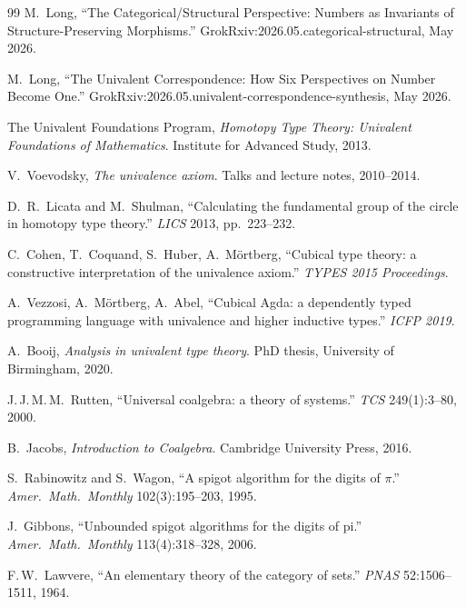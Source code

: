 \documentclass[12pt]{article}
\theoremstyle{definition}
\theoremstyle{remark}
\begin{document}
\begin{thebibliography}{99}
M.\ Long, ``The Categorical/Structural Perspective: Numbers as Invariants
of Structure-Preserving Morphisms.''
GrokRxiv:2026.05.categorical-structural, May 2026.

M.\ Long, ``The Univalent Correspondence: How Six Perspectives on Number
Become One.''
GrokRxiv:2026.05.univalent-correspondence-synthesis, May 2026.


The Univalent Foundations Program, \emph{Homotopy Type Theory: Univalent
Foundations of Mathematics}. Institute for Advanced Study, 2013.

V.\ Voevodsky, \emph{The univalence axiom}. Talks and lecture notes,
2010--2014.

D.\ R.\ Licata and M.\ Shulman, ``Calculating the fundamental group of
the circle in homotopy type theory.'' \emph{LICS} 2013, pp.\ 223--232.


C.\ Cohen, T.\ Coquand, S.\ Huber, A.\ M\"ortberg, ``Cubical type theory:
a constructive interpretation of the univalence axiom.''
\emph{TYPES 2015 Proceedings}.

A.\ Vezzosi, A.\ M\"ortberg, A.\ Abel, ``Cubical Agda: a dependently
typed programming language with univalence and higher inductive types.''
\emph{ICFP 2019}.

A.\ Booij, \emph{Analysis in univalent type theory}. PhD thesis,
University of Birmingham, 2020.


J.\,J.\,M.\,M.\ Rutten, ``Universal coalgebra: a theory of systems.''
\emph{TCS} 249(1):3--80, 2000.

B.\ Jacobs, \emph{Introduction to Coalgebra}. Cambridge University Press,
2016.

S.\ Rabinowitz and S.\ Wagon, ``A spigot algorithm for the digits of
$\pi$.'' \emph{Amer.\ Math.\ Monthly} 102(3):195--203, 1995.

J.\ Gibbons, ``Unbounded spigot algorithms for the digits of pi.''
\emph{Amer.\ Math.\ Monthly} 113(4):318--328, 2006.


F.\,W.\ Lawvere, ``An elementary theory of the category of sets.''
\emph{PNAS} 52:1506--1511, 1964.


\end{thebibliography}
\end{document}
